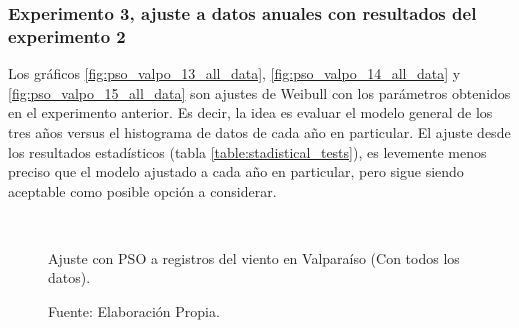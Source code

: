 \subsubsection{Experimento 3, ajuste a datos anuales con resultados del experimento 2}
Los gráficos \ref{fig:pso_valpo_13_all_data}, \ref{fig:pso_valpo_14_all_data} y \ref{fig:pso_valpo_15_all_data} son ajustes de Weibull con los parámetros obtenidos en el experimento anterior. Es decir, la idea es evaluar el modelo general de los tres años versus el histograma de datos de cada año en particular.
El ajuste desde los resultados estadísticos (tabla \ref{table:stadistical_tests}), es levemente menos preciso que el modelo ajustado a cada año en particular, pero sigue siendo aceptable como posible opción a considerar.
\begin{figure}[ht!]
    \centering
    \captionsetup{justification=centering,margin=2cm}
    \\   

    \caption{Ajuste con PSO a registros del viento en Valparaíso (Con todos los datos).}
    \caption*{Fuente: Elaboración Propia.}
    \label{fig:subfigures}
\end{figure}

